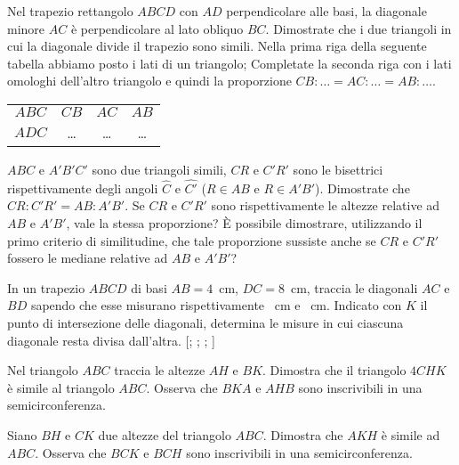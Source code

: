 \begin{multicols}{2}
\begin{esercizio}
\label{ese:6.62}
Nel trapezio rettangolo $ABCD$ con $AD$ perpendicolare alle basi, la diagonale minore $AC$ è perpendicolare al lato obliquo $BC$. Dimostrate che i due triangoli in cui la diagonale divide il trapezio sono simili. Nella prima riga della seguente tabella abbiamo posto i lati di un triangolo; Completate la seconda riga con i lati omologhi dell'altro triangolo e quindi la proporzione $CB:\ldots{}=AC:\ldots{}=AB:\ldots{}$.

\begin{center}
\begin{tabular}{cccc}
\toprule
$ABC$ & $CB$ & $AC$ & $AB$\\
$ADC$ & \ldots{} & \ldots{} & \ldots{}\\
\bottomrule
\end{tabular}
\end{center}
\end{esercizio}

\begin{esercizio}
\label{ese:6.63}
$ABC$ e $A'B'C'$ sono due triangoli simili, $CR$ e $C'R'$ sono le bisettrici rispettivamente degli angoli $\widehat{C}$ e $\widehat{C'}$ ($R\in AB$ e $R\in A'B'$). Dimostrate che $CR : C'R' = AB : A'B'$. Se $CR$ e $C'R'$ sono rispettivamente le altezze relative ad $AB$ e $A'B'$, vale la stessa proporzione? \`E possibile dimostrare, utilizzando il primo criterio di similitudine, che tale proporzione sussiste anche se $CR$ e $C'R'$ fossero le mediane relative ad $AB$ e $A'B'$?
\end{esercizio}

\begin{esercizio}
\label{ese:6.64}
In un trapezio $ABCD$ di basi $AB=4$~cm, $DC=8$~cm, traccia le diagonali $AC$ e $BD$ sapendo che esse misurano rispettivamente ~cm e ~cm. Indicato con $K$ il punto di intersezione delle diagonali, determina le misure in cui ciascuna diagonale resta divisa dall'altra. [; ; ; ]
\end{esercizio}

\begin{esercizio}
\label{ese:6.65}
Nel triangolo $ABC$ traccia le altezze $AH$ e $BK$. Dimostra che il triangolo $4CHK$ è simile al triangolo $ABC$. Osserva che $BKA$ e $AHB$ sono inscrivibili in una semicirconferenza.
\end{esercizio}

\begin{esercizio}
\label{ese:6.66}
Siano $BH$ e $CK$ due altezze del triangolo $ABC$. Dimostra che $AKH$ è simile ad $ABC$. Osserva che $BCK$ e $BCH$ sono inscrivibili in una semicirconferenza.
\end{esercizio}


\end{multicols}
